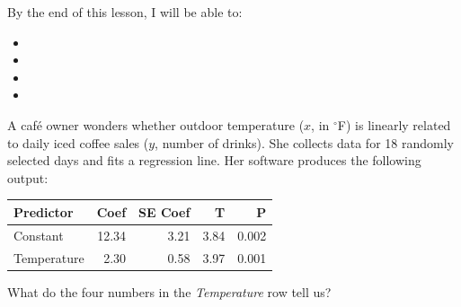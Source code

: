 \documentclass[10pt]{article}
\begin{document}
\namedateperiod

\begin{objectivebox}
By the end of this lesson, I will be able to:
\begin{itemize}
    \item[$\square$] \writeline
    \item[$\square$] \writeline
    \item[$\square$] \writeline
    \item[$\square$] \writeline
\end{itemize}
\end{objectivebox}

\begin{vocabbox}
\end{vocabbox}

\begin{hookbox}
A café owner wonders whether outdoor temperature ($x$, in ${}^\circ$F) is linearly
related to daily iced coffee sales ($y$, number of drinks). She collects data for 18
randomly selected days and fits a regression line. Her software produces the following
output:

\begin{center}
\renewcommand{\arraystretch}{1.4}
\begin{tabular}{lrrrr}
    \textbf{Predictor} & \textbf{Coef} & \textbf{SE Coef} & \textbf{T} & \textbf{P} \\
    \hline
    Constant    & 12.34 & 3.21 & 3.84 & 0.002 \\
    Temperature &  2.30 & 0.58 & 3.97 & 0.001 \\
\end{tabular}
\end{center}

What do the four numbers in the \textit{Temperature} row tell us?
\end{hookbox}
\end{document}
